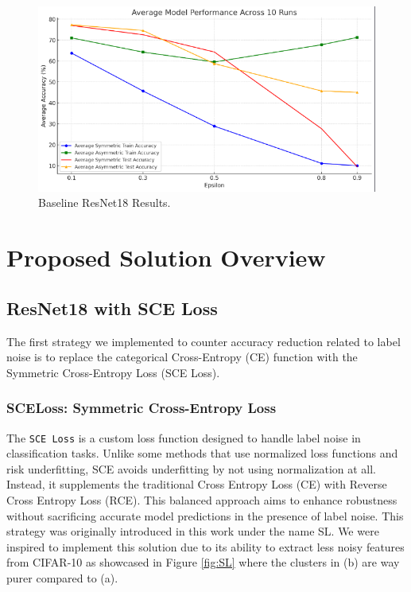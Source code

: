 \documentclass[11pt,twocolumn,letterpaper]{article}
\begin{document}
\begin{figure}[ht]
    \centering
    \includegraphics[width=1\linewidth, trim={0 0 10pt 0}, clip]{baselineResults.png}
    \caption{Baseline ResNet18 Results.}
    \label{fig:BaselineResults}
\end{figure}

\section{Proposed Solution Overview}
\subsection{ResNet18 with SCE Loss}

The first strategy we implemented to counter accuracy reduction related to label noise is to replace the categorical Cross-Entropy (CE) function with the Symmetric Cross-Entropy Loss (SCE Loss).

\subsubsection*{SCELoss: Symmetric Cross-Entropy Loss}

The \texttt{SCE Loss} is a custom loss function designed to handle label noise in classification tasks. Unlike some methods that use normalized loss functions and risk underfitting, SCE avoids underfitting by not using normalization at all. Instead, it supplements the traditional Cross Entropy Loss (CE) with Reverse Cross Entropy Loss (RCE). This balanced approach aims to enhance robustness without sacrificing accurate model predictions in the presence of label noise. This strategy was originally introduced in this work \cite{wangSymmetricCrossEntropy2019} under the name SL. We were inspired to implement this solution due to its ability to extract less noisy features from CIFAR-10 as showcased in Figure \ref{fig:SL} where the clusters in (b) are way purer compared to (a). 
\end{document}
